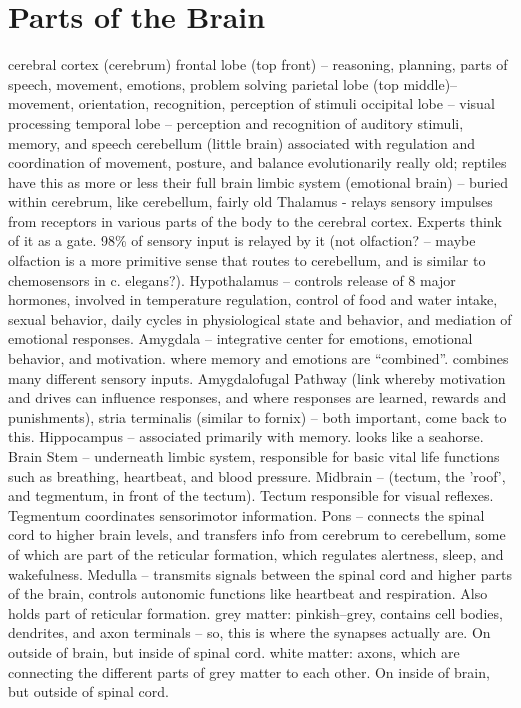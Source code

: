 \documentclass[11pt, a4paper, oneside]{article}   	%
\begin{document}
\section{Parts of the Brain}

\begin{outline}
    \point cerebral cortex (cerebrum)
        \subpoint frontal lobe (top front) -- reasoning, planning, parts of speech, movement, emotions, problem solving
        \subpoint parietal lobe (top middle)-- movement,  orientation, recognition, perception of stimuli
        \subpoint occipital lobe -- visual processing
        \subpoint temporal lobe -- perception and recognition of auditory stimuli, memory, and speech
    \point cerebellum (little brain)
        \subpoint associated with regulation and coordination of movement, posture, and balance
        \subpoint evolutionarily really old; reptiles have this as more or less their full brain
    \point limbic system (emotional brain) -- buried within cerebrum, like cerebellum, fairly old
      \subpoint Thalamus - relays sensory impulses from receptors in various parts of the body to the cerebral cortex. Experts think of it as a gate. 98\% of sensory input is relayed by it (not olfaction? -- maybe olfaction is a more primitive sense that routes to cerebellum, and is similar to chemosensors in c. elegans?).
      \subpoint Hypothalamus  -- controls release of 8 major hormones, involved in temperature regulation, control of food and water intake,  sexual behavior,  daily cycles in physiological state and behavior, and mediation of emotional responses. 
      \subpoint Amygdala -- integrative center for emotions, emotional behavior, and motivation.  where memory and emotions are ``combined''. combines many different sensory inputs.
        \subsubpoint Amygdalofugal Pathway (link whereby motivation and drives can influence responses, and where responses are learned, rewards and punishments), stria terminalis (similar to fornix) -- both important, come back to this.
      \subpoint Hippocampus -- associated primarily with memory. looks like a seahorse. 
    \point Brain Stem -- underneath limbic system, responsible for basic vital life functions such as breathing, heartbeat, and blood pressure.
        \subpoint Midbrain -- (tectum, the 'roof', and tegmentum, in front of the tectum). Tectum responsible for visual reflexes. Tegmentum coordinates sensorimotor  information. 
        \subpoint Pons -- connects the spinal cord to higher brain levels, and transfers info from cerebrum to cerebellum, some of which are part of the reticular formation, which  regulates alertness, sleep, and wakefulness.
        \subpoint Medulla -- transmits signals between the spinal cord and higher parts of the brain, controls autonomic functions like heartbeat and respiration. Also holds part of reticular formation.
    \point grey matter: pinkish--grey, contains cell bodies, dendrites, and axon terminals -- so, this is where the synapses actually are. On outside of brain, but inside of spinal cord.
    \point white matter: axons, which are connecting the different parts of grey matter to each other. On inside of brain, but outside of spinal cord.
\end{outline}
\end{document}
